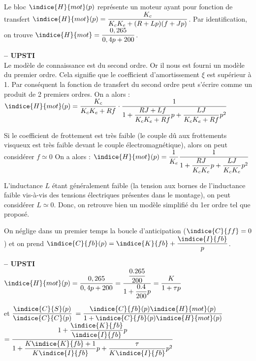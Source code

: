 Le bloc  $\indice{H}{mot} (p)$ représente un moteur ayant pour fonction de transfert
$\indice{H}{mot} (p)=\dfrac{K_c}{K_c K_e+(R+Lp)( f +Jp)}$. Par identification, on trouve $\indice{H}{mot}= \dfrac{0,265}{0,4 p+200}$.


\ifprof
\begin{corrige}\textbf{ -- UPSTI}\\ 
Le modèle de connaissance est du second ordre. Or il nous est fourni un modèle du premier ordre. Cela signifie que le coefficient d’amortissement $\xi$ est supérieur à 1. Par conséquent la fonction de transfert du second ordre peut s’écrire comme un produit de 2 premiers ordres.
On a alors :
$\indice{H}{mot} (p)=\dfrac{K_c}{K_c K_e+Rf} \cdot \dfrac{1}{1+\dfrac{RJ+Lf}{K_c K_e+Rf}p+\dfrac{LJ}{K_c K_e+Rf}p^2}$ 
 
Si le coefficient de frottement est très faible (le couple dû aux frottements visqueux est très faible devant le couple électromagnétique), alors on peut considérer $f\simeq 0$
On a alors :
$\indice{H}{mot}(p)=\dfrac{1}{K_e} \dfrac{1}{1+\dfrac{RJ}{K_c K_e } p+\dfrac{LJ}{K_c K_e }p^2}$

L’inductance $L$ étant généralement faible (la tension aux bornes de l’inductance faible vis-à-vis des tensions électriques présentes dans le montage), on peut considérer $ L \simeq 0$.
Donc, on retrouve bien un modèle simplifié du 1er ordre tel que proposé.
 

\end{corrige}
\else
\fi

On néglige dans un premier temps la boucle d'anticipation ($\indice{C}{ff} =0$) et on prend
$\indice{C}{fb}( p)=\indice{K}{fb}+\dfrac{\indice{I}{fb}}{p}$.

\ifprof
\begin{corrige}\textbf{ -- UPSTI}\\ 
$\indice{H}{mot} (p)=\dfrac{0,265}{0,4p+200}=\dfrac{\dfrac{0.265}{200}}{1+\dfrac{0.4}{200} p}=\dfrac{K}{1+\tau p}$

et $\dfrac{\indice{C}{S}(p)}{\indice{C}{C}(p)} $
$=\dfrac{\indice{C}{fb} (p) \indice{H}{mot} (p)}{1+\indice{C}{fb} (p) \indice{H}{mot} (p)}$
$=\dfrac{1+\dfrac{\indice{K}{fb}}{\indice{I}{fb}}  p}{1+\dfrac{K\indice{K}{fb}+1}{K\indice{I}{fb}} p+\dfrac{\tau}{K\indice{I}{fb} } p^2}$


\end{corrige}
\else
\fi

